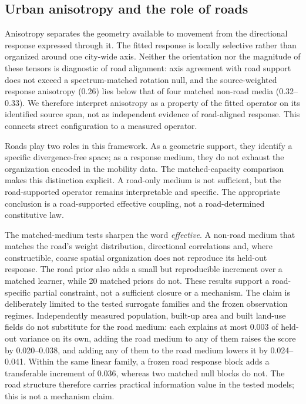 \documentclass[11pt]{article}
\begin{document}
\subsection{Urban anisotropy and the role of roads}

Anisotropy separates the geometry available to movement from the directional response expressed through it. The fitted response is locally selective rather than organized around one city-wide axis. Neither the orientation nor the magnitude of these tensors is diagnostic of road alignment: axis agreement with road support does not exceed a spectrum-matched rotation null, and the source-weighted response anisotropy (0.26) lies below that of four matched non-road media (0.32--0.33). We therefore interpret anisotropy as a property of the fitted operator on its identified source span, not as independent evidence of road-aligned response. This connects street configuration \cite{hillier1993,penn1998,wang2012} to a measured operator.

Roads play two roles in this framework. As a geometric support, they identify a specific divergence-free space; as a response medium, they do not exhaust the organization encoded in the mobility data. The matched-capacity comparison makes this distinction explicit. A road-only medium is not sufficient, but the road-supported operator remains interpretable and specific. The appropriate conclusion is a road-supported effective coupling, not a road-determined constitutive law.

The matched-medium tests sharpen the word \emph{effective}. A non-road medium that matches the road's weight distribution, directional correlations and, where constructible, coarse spatial organization does not reproduce its held-out response. The road prior also adds a small but reproducible increment over a matched learner, while 20 matched priors do not. These results support a road-specific partial constraint, not a sufficient closure or a mechanism. The claim is deliberately limited to the tested surrogate families and the frozen observation regimes. Independently measured population, built-up area and built land-use fields do not substitute for the road medium: each explains at most 0.003 of held-out variance on its own, adding the road medium to any of them raises the score by 0.020--0.038, and adding any of them to the road medium lowers it by 0.024--0.041. Within the same linear family, a frozen road response block adds a transferable increment of 0.036, whereas two matched null blocks do not. The road structure therefore carries practical information value in the tested models; this is not a mechanism claim.
\end{document}
